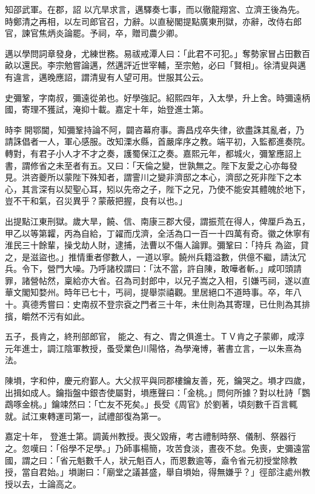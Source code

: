 \begin{pinyinscope}
 知邵武軍。在郡，詔
 以亢旱求言，邁驛奏七事，而以徹龍翔宮、立濟王後為先。時鄭清之再相，以左司郎官召，力辭。以直秘閣提點廣東刑獄，亦辭，改侍右郎官，諫官焦炳炎論罷。予祠，卒，贈司農少卿。



 邁以學問詞章發身，尤練世務。易祓戒潭人曰：「此君不可犯。」奪勢家冒占田數百畝以還民。李宗勉嘗論邁，然邁評近世宰輔，至宗勉，必曰「賢相」。徐清叟與邁有違言，邁晚應詔，謂清叟有人望可用。世服其公云。



 史彌鞏，字南叔，彌遠從弟也。好學強記。紹熙四年，入太學，升上舍。時彌遠柄國，寄理不獲試，淹抑十載。嘉定十年，始登進士第。



 時李𡌴開鄂閫，知彌鞏持論不阿，闢咨幕府事。壽昌戍卒失律，欲盡誅其亂者，乃請誅倡者一人，軍心感服。改知溧水縣，首嚴庠序之教。端平初，入監都進奏院。轉對，有君子小人才不才之奏，護蜀保江之奏。嘉熙元年，都城火，彌鞏應詔上書，謂修省之未至者有五。又曰：「天倫之變，世孰無之。陛下友愛之心亦每發
 見。洪咨夔所以蒙陛下殊知者，謂霅川之變非濟邸之本心，濟邸之死非陛下之本心，其言深有以契聖心耳，矧以先帝之子，陛下之兄，乃使不能安其體魄於地下，豈不干和氣，召災異乎？蒙蔽把握，良有以也。」



 出提點江東刑獄。歲大旱，饒、信、南康三郡大侵，謂振荒在得人，俾厘戶為五，甲乙以等第糶，丙為自給，丁糴而戊濟，全活為口一百一十四萬有奇。徽之休寧有淮民三十餘輩，操戈劫人財，逮捕，法曹以不傷人論罪。彌鞏曰：「持兵
 為盜，貸之，是滋盜也。」推情重者僇數人，一道以寧。饒州兵籍溢數，供億不繼，請汰冗兵。令下，營門大噪。乃呼諸校謂曰：「汰不當，許自陳，敢嘩者斬。」咸叩頭請罪，諸營帖然，稟給亦大省。召為司封郎中，以兄子嵩之入相，引嫌丐祠，遂以直華文閣知婺州。時年已七十，丐祠，提舉崇禧觀。里居絕口不道時事。卒，年八十。真德秀嘗曰：史南叔不登宗袞之門者三十年，未仕則為其寄理，已仕則為其排擯，皭然不污有如此。



 五子，長肯之，終刑部郎官，
 能之、有之、胄之俱進士。ＴＶ肯之子蒙卿，咸淳元年進士，調江陰軍教授，蚤受業色川陽恪，為學淹博，著書立言，一以朱熹為法。



 陳塤，字和仲，慶元府鄞人。大父叔平與同郡樓鑰友善，死，鑰哭之。塤才四歲，出揖如成人。鑰指盤中銀杏使屬對，塤應聲曰：「金桃。」問何所據？對以杜詩「鸚鵡啄金桃。」鑰竦然曰：「亡友不死矣。」長受《周官》於劉著，頃刻數千百言輒就。試江東轉運司第一，試禮部復為第一。



 嘉定十年，
 登進士第。調黃州教授。喪父毀瘠，考古禮制時祭、儀制、祭器行之。忽嘆曰：「俗學不足學。」乃師事楊簡，攻苦食淡，晝夜不怠。免喪，史彌遠當國，謂之曰：「省元魁數千人，狀元魁百人，而恩數逾等，盍令省元初授堂除教授，當自君始。」塤謝曰：「廟堂之議甚盛，舉自塤始，得無嫌乎？」徑部注處州教授以去，士論高之。




\end{pinyinscope}
